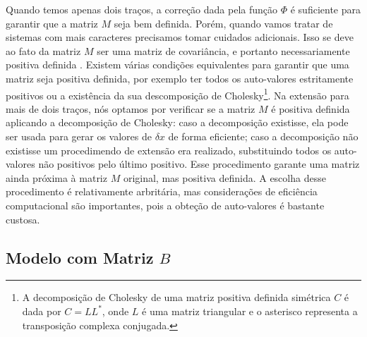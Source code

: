 \documentclass[a4paper, 12pt, titlepage, onecolumn]{article}
\numberwithin{equation}{section}
\numberwithin{table}{section}
\begin{document}
Quando temos apenas dois traços, a correção dada pela função $\Phi$ é
suficiente para garantir que a matriz $M$ seja bem definida. Porém,
quando vamos tratar de sistemas com mais caracteres precisamos tomar
cuidados adicionais. Isso se deve ao fato da matriz $M$ ser uma matriz
de covariância, e portanto necessariamente positiva
definida \citep{Anderson1984}. Existem várias condições equivalentes
para garantir que uma matriz seja positiva definida, por exemplo ter
todos os auto-valores estritamente positivos ou a existência da sua descomposição de
Cholesky\footnote{A decomposição de Cholesky de uma matriz positiva
definida simétrica $C$ é dada por $C=LL^*$, onde $L$ é uma matriz triangular e o asterisco
representa a transposição complexa conjugada.}. Na extensão para mais de dois
traços, nós optamos por verificar se a matriz $M$ é positiva definida
aplicando a decomposição de Cholesky: caso a decomposição existisse,
ela pode ser usada para gerar os valores de $\delta x$ de forma
eficiente; caso a decomposição não existisse um procedimendo de extensão
\citep{Marroig2011b} era realizado, substituindo todos os auto-valores
não positivos pelo último positivo. Esse procedimento garante uma matriz
ainda próxima à matriz $M$ original, mas positiva definida. A
escolha desse procedimento é relativamente arbritária, mas considerações
de eficiência computacional são importantes, pois a obteção de auto-valores é
bastante custosa. 

\subsection{Modelo com Matriz $B$}
\end{document}
